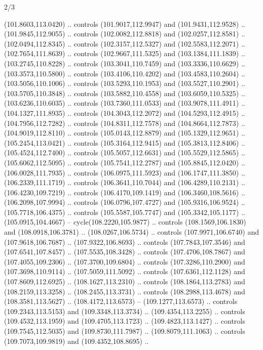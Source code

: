 \begin{flagdescription}{2/3}
\begin{scope}[shift={(0.5\flaglength,0.5)},scale=\flagwidth/320]
\begin{scope}[y=0.8pt, x=0.8pt, yscale=-1,shift={(-118.3,-146)}]
  (101.8603,113.0420) .. controls (101.9017,112.9947) and (101.9431,112.9528) ..
  (101.9845,112.9055) .. controls (102.0082,112.8818) and (102.0257,112.8581) ..
  (102.0494,112.8345) .. controls (102.3157,112.5327) and (102.5583,112.2071) ..
  (102.7654,111.8639) .. controls (102.9667,111.5325) and (103.1384,111.1839) ..
  (103.2745,110.8228) .. controls (103.3041,110.7459) and (103.3336,110.6629) ..
  (103.3573,110.5800) .. controls (103.4106,110.4202) and (103.4583,110.2604) ..
  (103.5056,110.1006) .. controls (103.5293,110.1953) and (103.5527,110.2901) ..
  (103.5705,110.3848) .. controls (103.5882,110.4558) and (103.6059,110.5325) ..
  (103.6236,110.6035) .. controls (103.7360,111.0533) and (103.9078,111.4911) ..
  (104.1327,111.8935) .. controls (104.3043,112.2072) and (104.5293,112.4915) ..
  (104.7956,112.7282) .. controls (104.8311,112.7578) and (104.8664,112.7873) ..
  (104.9019,112.8110) .. controls (105.0143,112.8879) and (105.1329,112.9651) ..
  (105.2454,113.0421) .. controls (105.3164,112.9415) and (105.3813,112.8406) ..
  (105.4524,112.7400) .. controls (105.5057,112.6631) and (105.5529,112.5865) ..
  (105.6062,112.5095) .. controls (105.7541,112.2787) and (105.8845,112.0420) ..
  (106.0028,111.7935) .. controls (106.0975,111.5923) and (106.1747,111.3850) ..
  (106.2339,111.1719) .. controls (106.3641,110.7044) and (106.4289,110.2131) ..
  (106.4230,109.7219) .. controls (106.4170,109.1419) and (106.3460,108.5616) ..
  (106.2098,107.9994) .. controls (106.0796,107.4727) and (105.9316,106.9524) ..
  (105.7718,106.4375) .. controls (105.5587,105.7747) and (105.3342,105.1177) ..
  (105.0915,104.4667) -- cycle(108.2220,105.9877) .. controls
  (108.1569,106.1830) and (108.0918,106.3781) .. (108.0267,106.5734) .. controls
  (107.9971,106.6740) and (107.9618,106.7687) .. (107.9322,106.8693) .. controls
  (107.7843,107.3546) and (107.6541,107.8457) .. (107.5535,108.3428) .. controls
  (107.4706,108.7867) and (107.4055,109.2306) .. (107.3700,109.6804) .. controls
  (107.3286,110.2900) and (107.3698,110.9114) .. (107.5059,111.5092) .. controls
  (107.6361,112.1128) and (107.8609,112.6925) .. (108.1627,113.2310) .. controls
  (108.1864,113.2783) and (108.2159,113.3258) .. (108.2455,113.3731) .. controls
  (108.2988,113.4678) and (108.3581,113.5627) .. (108.4172,113.6573) --
  (109.1277,113.6573) .. controls (109.2343,113.5153) and (109.3348,113.3734) ..
  (109.4354,113.2255) .. controls (109.4532,113.1959) and (109.4705,113.1723) ..
  (109.4823,113.1427) .. controls (109.7545,112.5035) and (109.8730,111.7987) ..
  (109.8079,111.1063) .. controls (109.7073,109.9819) and (109.4352,108.8695) ..

\end{scope}
\end{scope}
\end{flagdescription}
